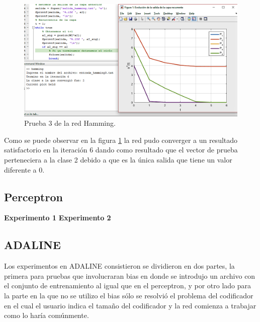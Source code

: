 \begin{figure}[H]
    \begin{center}
        \includegraphics[width=16cm]{img/hamming/hamming3.png}
        \caption{Prueba 3 de la red Hamming.}
        \label{fig:hamming3}
    \end{center}
\end{figure}
Como se puede observar en la figura \ref{fig:hamming3} la red pudo converger a un resultado satisfactorio en la iteración 6 dando como resultado que el vector de prueba perteneciera a la clase 2 debido a que es la única salida que tiene un valor diferente a 0.
\newpage
\subsection{Perceptron}
\textbf{Experimento 1}
\textbf{Experimento 2}
\subsection{ADALINE}
Los experimentos en ADALINE consistieron se dividieron en dos partes, la primera para pruebas que involucraran bias en donde se introdujo un archivo con el conjunto de entrenamiento al igual que en el perceptron, y por otro lado para la parte en la que no se utilizo el bias sólo se resolvió el problema del codificador en el cual el usuario indica el tamaño del codificador y la red comienza a trabajar como lo haría comúnmente.

